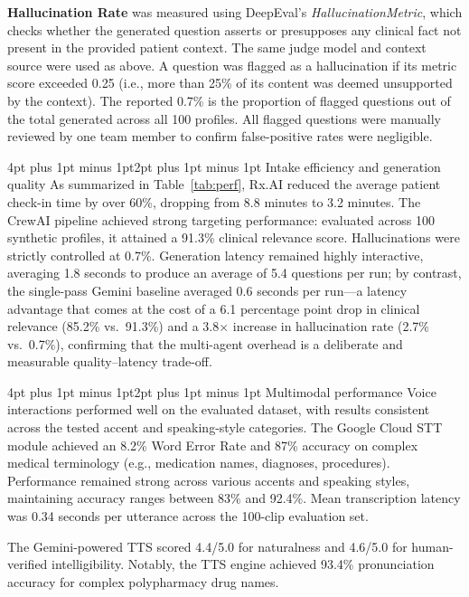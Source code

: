 \documentclass[sigplan,screen]{acmart}
\makeatletter
\renewcommand{\subsection}{\@startsection{subsection}{2}{\z@}
  {4pt plus 1pt minus 1pt}{2pt plus 1pt minus 1pt}
  {\normalfont\normalsize\bfseries}}
\makeatother
\begin{document}
\noindent\textbf{Hallucination Rate} was measured using DeepEval's
\textit{HallucinationMetric}, which checks whether the generated question
asserts or presupposes any clinical fact not present in the provided patient
context. The same judge model and context source were used as above. A question
was flagged as a hallucination if its metric score exceeded 0.25 (i.e., more
than 25\% of its content was deemed unsupported by the context). The reported
0.7\% is the proportion of flagged questions out of the total generated across
all 100 profiles. All flagged questions were manually reviewed by one team member
to confirm false-positive rates were negligible.

\subsection{Intake efficiency and generation quality}
As summarized in Table~\ref{tab:perf}, Rx.AI reduced the average patient check-in time by over 60\%, dropping from 8.8 minutes to 3.2 minutes. The CrewAI pipeline achieved strong targeting performance: evaluated across
100 synthetic profiles, it attained a 91.3\% clinical relevance score. Hallucinations were strictly controlled at 0.7\%. Generation latency remained highly interactive, averaging 1.8 seconds to
produce an average of 5.4 questions per run; by contrast, the single-pass
Gemini baseline averaged 0.6 seconds per run---a latency advantage that comes
at the cost of a 6.1 percentage point drop in clinical relevance (85.2\% vs.\
91.3\%) and a 3.8$\times$ increase in hallucination rate (2.7\% vs.\ 0.7\%),
confirming that the multi-agent overhead is a deliberate and measurable
quality--latency trade-off.

\subsection{Multimodal performance}
Voice interactions performed well on the evaluated dataset, with results
consistent across the tested accent and speaking-style categories. The Google Cloud STT module achieved an 8.2\% Word Error Rate and 87\% accuracy on complex medical terminology (e.g., medication names, diagnoses, procedures). Performance remained strong across various accents and speaking styles, maintaining accuracy ranges between 83\% and 92.4\%. Mean transcription latency was 0.34 seconds per utterance across the 100-clip evaluation set.

The Gemini-powered TTS scored 4.4/5.0 for naturalness and 4.6/5.0 for human-verified intelligibility. Notably, the TTS engine achieved 93.4\% pronunciation accuracy for complex polypharmacy drug names. 
\end{document}
